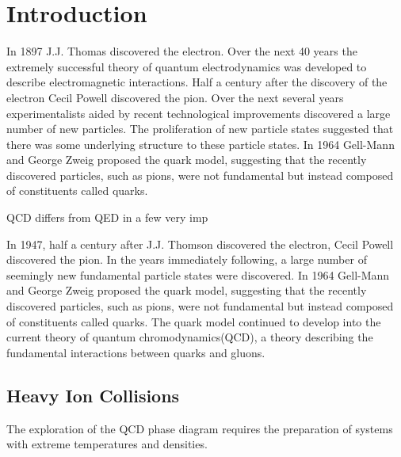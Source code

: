 \section{Introduction}
In 1897 J.J. Thomas discovered the electron\cite{}. Over the next 40 years the extremely successful theory of quantum electrodynamics was developed to describe electromagnetic interactions. Half a century after the discovery of the electron Cecil Powell discovered the pion\cite{}. Over the next several years experimentalists aided by recent technological improvements discovered a large number of new particles. The proliferation of new particle states suggested that there was some underlying structure to these particle states. In 1964 Gell-Mann and George Zweig proposed the quark model\cite{}, suggesting that the recently discovered particles, such as pions, were not fundamental but instead composed of constituents called quarks. 

QCD differs from QED in a few very imp


In 1947, half a century after J.J. Thomson discovered the electron, Cecil Powell discovered the pion\cite{}\cite{}. In the years immediately following, a large number of seemingly new fundamental particle states were discovered. In 1964 Gell-Mann and George Zweig proposed the quark model, suggesting that the recently discovered particles, such as pions, were not fundamental but instead composed of constituents called quarks\cite{}. The quark model continued to develop into the current theory of quantum chromodynamics(QCD), a theory describing the fundamental interactions between quarks and gluons. 



\subsection{Heavy Ion Collisions}

The exploration of the QCD phase diagram requires the preparation of systems with extreme temperatures and densities.  
